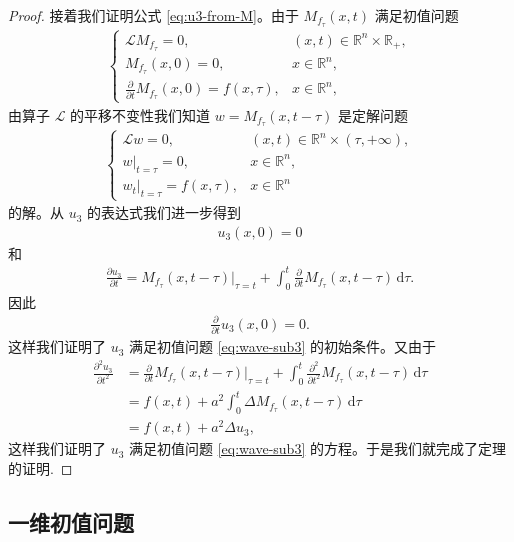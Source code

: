 \documentclass[../../main.tex]{subfiles}%
\begin{document}
\begin{proof}
接着我们证明公式 \eqref{eq:u3-from-M}。由于 $M_{f_\tau}(x,t)$ 满足初值问题
\begin{align*}
\begin{cases}
\mathcal{L}M_{f_\tau}=0, & (x,t)\in\mathbb{R}^n\times\mathbb{R}_+, \\
M_{f_\tau}(x,0)=0, & x\in\mathbb{R}^n, \\
\frac{\partial}{\partial t}M_{f_\tau}(x,0)=f(x,\tau), & x\in\mathbb{R}^n,
\end{cases}
\end{align*}
由算子 $\mathcal{L}$ 的平移不变性我们知道 $w=M_{f_\tau}(x,t-\tau)$ 是定解问题
\begin{align*}
\begin{cases}
\mathcal{L}w=0, & (x,t)\in\mathbb{R}^n\times(\tau,+\infty), \\
w|_{t=\tau}=0, & x\in\mathbb{R}^n, \\
w_t|_{t=\tau}=f(x,\tau), & x\in\mathbb{R}^n
\end{cases}
\end{align*}
的解。从 $u_3$ 的表达式我们进一步得到
\begin{align*}
u_3(x,0)=0
\end{align*}
和
\begin{align*}
\frac{\partial u_3}{\partial t}=M_{f_\tau}(x,t-\tau)|_{\tau=t}+\int_0^t\frac{\partial}{\partial t}M_{f_\tau}(x,t-\tau)\,\mathrm{d}\tau.
\end{align*}
因此
\begin{align*}
\frac{\partial}{\partial t}u_3(x,0)=0.
\end{align*}
这样我们证明了 $u_3$ 满足初值问题 \eqref{eq:wave-sub3} 的初始条件。又由于
\begin{align*}
\frac{\partial^2u_3}{\partial t^2}
&=\frac{\partial}{\partial t}M_{f_\tau}(x,t-\tau)|_{\tau=t}+\int_0^t\frac{\partial^2}{\partial t^2}M_{f_\tau}(x,t-\tau)\,\mathrm{d}\tau \\
&=f(x,t)+a^2\int_0^t\Delta M_{f_\tau}(x,t-\tau)\,\mathrm{d}\tau \\
&=f(x,t)+a^2\Delta u_3,
\end{align*}
这样我们证明了 $u_3$ 满足初值问题 \eqref{eq:wave-sub3} 的方程。于是我们就完成了定理的证明.
\end{proof}



\subsection{一维初值问题}
\end{document}
